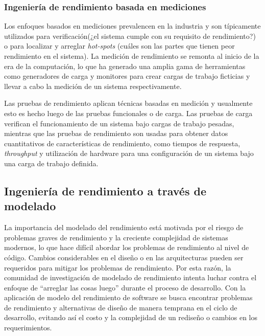 \documentclass[article]{IEEEtran}
\begin{document}
\subsubsection{Ingeniería de rendimiento basada en mediciones}
Los enfoques basados en mediciones prevalencen en la industria\cite{thijmen-thesis} y son típicamente utilizados para verificación(¿el sistema cumple con su requisito de rendimiento?) o para localizar y arreglar \emph{hot-spots} (cuáles son las partes que tienen peor rendimiento en el sistema). La medición de rendimiento se remonta al inicio de la era de la computación, lo que ha generado una amplia gama de herramientas como generadores de carga y monitores para crear cargas de trabajo ficticias y llevar a cabo la medición de un sistema respectivamente.

Las pruebas de rendimiento aplican técnicas basadas en medición y usualmente esto es hecho luego de las pruebas funcionales o de carga. Las pruebas de carga verifican el funcionamiento de un sistema bajo cargas de trabajo pesadas, mientras que las pruebas de rendimiento son usadas para obtener datos cuantitativos de características de rendimiento, como tiempos de respuesta, \emph{throughput} y utilización de hardware para una configuración de un sistema bajo una carga de trabajo definida.

\subsection{Ingeniería de rendimiento a través de modelado} 
La importancia del modelado del rendimiento está motivada por el riesgo de problemas graves de rendimiento\cite{palladion-screencast} y la creciente complejidad de sistemas modernos, lo que hace difícil abordar los problemas de rendimiento al nivel de código. Cambios considerables en el diseño o en las arquitecturas pueden ser requeridos para mitigar los problemas de rendimiento. Por esta razón, la comunidad de investigación de modelado de rendimiento intenta luchar contra el enfoque de ``arreglar las cosas luego'' durante el proceso de desarrollo. Con la aplicación de modelo del rendimiento de software se busca encontrar problemas de rendimiento y alternativas de diseño de manera temprana en el ciclo de desarrollo, evitando así el costo y la complejidad de un rediseño o cambios en los requerimientos.
\end{document}
